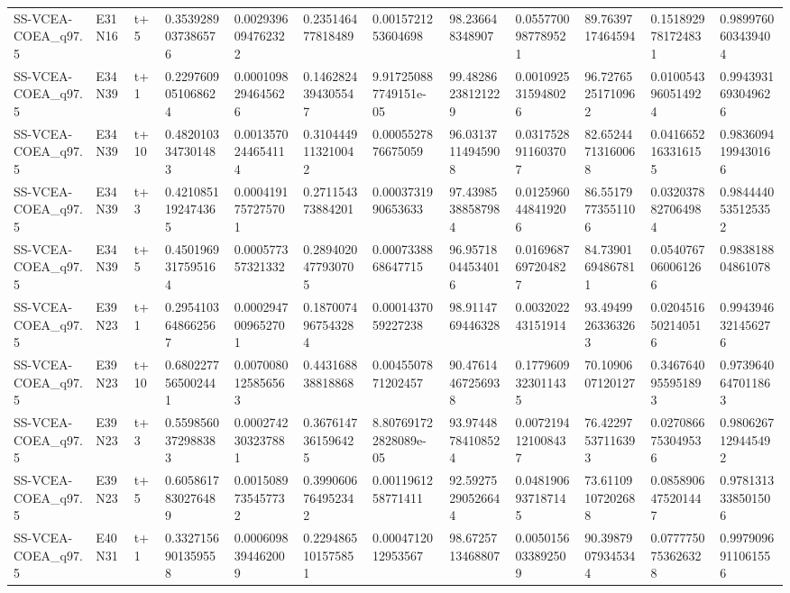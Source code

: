 \begin{landscape}
\begin{longtable}{llllllllllll}
SS-VCEA-COEA\_q97.5 & E31N16 & t+5 & 0.3539289037386576 & 0.0029396094762322 & 0.235146477818489 & 0.0015721253604698 & 98.236648348907 & 0.0557700987789521 & 89.7639717464594 & 0.1518929781724831 & 0.9899760603439404 \\
SS-VCEA-COEA\_q97.5 & E34N39 & t+1 & 0.2297609051068624 & 0.0001098294645626 & 0.1462824394305547 & 9.917250887749151e-05 & 99.48286238121229 & 0.0010925315948026 & 96.72765251710962 & 0.0100543960514924 & 0.9943931693049626 \\
SS-VCEA-COEA\_q97.5 & E34N39 & t+10 & 0.4820103347301483 & 0.0013570244654114 & 0.3104449113210042 & 0.0005527876675059 & 96.03137114945908 & 0.0317528911603707 & 82.65244713160068 & 0.0416652163316155 & 0.9836094199430166 \\
SS-VCEA-COEA\_q97.5 & E34N39 & t+3 & 0.4210851192474365 & 0.0004191757275701 & 0.271154373884201 & 0.0003731990653633 & 97.43985388587984 & 0.0125960448419206 & 86.55179773551106 & 0.0320378827064984 & 0.9844440535125352 \\
SS-VCEA-COEA\_q97.5 & E34N39 & t+5 & 0.4501969317595164 & 0.000577357321332 & 0.2894020477930705 & 0.0007338868647715 & 96.95718044534016 & 0.0169687697204827 & 84.73901694867811 & 0.0540767060061266 & 0.983818804861078 \\
SS-VCEA-COEA\_q97.5 & E39N23 & t+1 & 0.2954103648662567 & 0.0002947009652701 & 0.1870074967543284 & 0.0001437059227238 & 98.9114769446328 & 0.003202243151914 & 93.49499263363263 & 0.0204516502140516 & 0.9943946321456276 \\
SS-VCEA-COEA\_q97.5 & E39N23 & t+10 & 0.6802277565002441 & 0.0070080125856563 & 0.443168838818868 & 0.0045507871202457 & 90.47614467256938 & 0.1779609323011435 & 70.1090607120127 & 0.3467640955951893 & 0.9739640647011863 \\
SS-VCEA-COEA\_q97.5 & E39N23 & t+3 & 0.5598560372988383 & 0.0002742303237881 & 0.3676147361596425 & 8.807691722828089e-05 & 93.97448784108524 & 0.0072194121008437 & 76.42297537116393 & 0.0270866753049536 & 0.9806267129445492 \\
SS-VCEA-COEA\_q97.5 & E39N23 & t+5 & 0.6058617830276489 & 0.0015089735457732 & 0.3990606764952342 & 0.0011961258771411 & 92.59275290526644 & 0.0481906937187145 & 73.61109107202688 & 0.0858906475201447 & 0.9781313338501506 \\
SS-VCEA-COEA\_q97.5 & E40N31 & t+1 & 0.3327156901359558 & 0.0006098394462009 & 0.2294865101575851 & 0.0004712012953567 & 98.6725713468807 & 0.0050156033892509 & 90.39879079345344 & 0.0777750753626328 & 0.9979096911061556 \\

\end{longtable}
\end{landscape}
